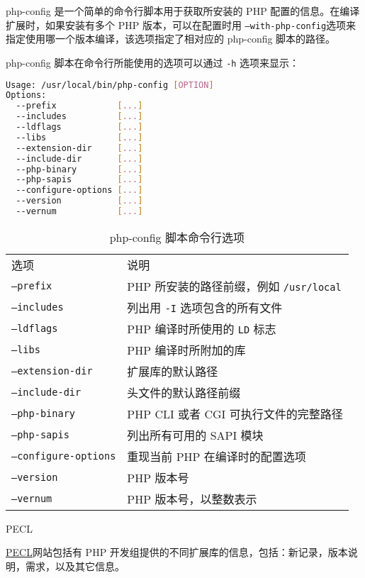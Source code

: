 \begin{compactitem}
php-config 是一个简单的命令行脚本用于获取所安装的 PHP 配置的信息。在编译扩展时，如果安装有多个 PHP 版本，可以在配置时用 \texttt{--with-php-config}选项来指定使用哪一个版本编译，该选项指定了相对应的 php-config 脚本的路径。

php-config 脚本在命令行所能使用的选项可以通过 \texttt{-h} 选项来显示：

\begin{lstlisting}[language=bash]
Usage: /usr/local/bin/php-config [OPTION]
Options:
  --prefix            [...]
  --includes          [...]
  --ldflags           [...]
  --libs              [...]
  --extension-dir     [...]
  --include-dir       [...]
  --php-binary        [...]
  --php-sapis         [...]
  --configure-options [...]
  --version           [...]
  --vernum            [...]
\end{lstlisting}

\begin{table}[htbp]
\centering
\caption{php-config 脚本命令行选项}
\label{PHP_commandline}
\begin{tabular}{ll}
\hline
选项					&说明\\
\texttt{--prefix}			&PHP 所安装的路径前缀，例如 \texttt{/usr/local}\\
\texttt{--includes}		&列出用 \texttt{-I} 选项包含的所有文件\\
\texttt{--ldflags}		&PHP 编译时所使用的 \texttt{LD} 标志\\
\texttt{--libs}			&PHP 编译时所附加的库\\
\texttt{--extension-dir}	&扩展库的默认路径\\
\texttt{--include-dir}	&头文件的默认路径前缀\\
\texttt{--php-binary}	&PHP CLI 或者 CGI 可执行文件的完整路径\\
\texttt{--php-sapis}		&列出所有可用的 SAPI 模块\\
\texttt{--configure-options}	&重现当前 PHP 在编译时的配置选项\\
\texttt{--version}		&PHP 版本号\\
\texttt{--vernum}		&PHP 版本号，以整数表示\\
\end{tabular}
\end{table}

\item PECL

\href{http://pecl.php.net/}{PECL}网站包括有 PHP 开发组提供的不同扩展库的信息，包括：新记录，版本说明，需求，以及其它信息。




\end{compactitem}
